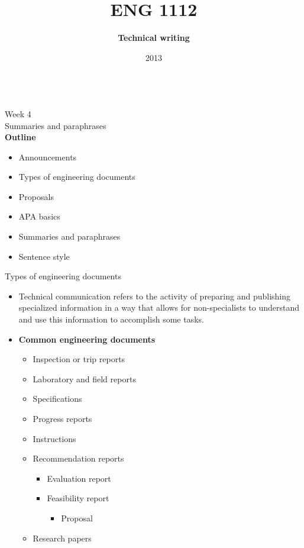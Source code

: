 \documentclass[]{article}
\begin{document}
	\title{ENG 1112}
	\author{{\bf Technical writing}}
	\date{2013}
	\maketitle
	\noindent
	\pagebreak\\
	\normalsize
	\Large{Week 4}\\
	\large{Summaries and paraphrases}\\
	\normalsize
	{\bf Outline}
	\begin{itemize}
		\item Announcements
		\item Types of engineering documents
		\item Proposals
		\item APA basics
		\item Summaries and paraphrases
		\item Sentence style
	\end{itemize}
	\vspace{10mm}
	\large{Types of engineering documents}\\
	\begin{itemize}
		\item Technical communication refers to the activity of preparing and publishing specialized information in a way that allows for non-specialists to understand and use this information to accomplish some tasks.
		\item {\bf Common engineering documents}
		\begin{itemize}
			\item Inspection or trip reports
			\item Laboratory and field reports
			\item Specifications
			\item Progress reports
			\item Instructions
			\item Recommendation reports
			\begin{itemize}
				\item Evaluation report
				\item Feasibility report
				\begin{itemize}
					\item Proposal
				\end{itemize}
			\end{itemize}
			\item Research papers
		\end{itemize}
	\end{itemize}
	\pagebreak
\end{document}
